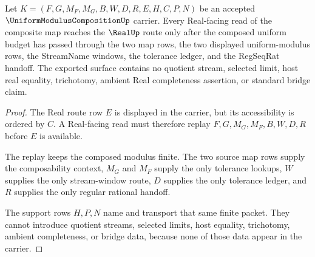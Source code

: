 \begin{theorem}
\label{thm:uniform-modulus-composition-real-route}
Let $K=(F,G,M_F,M_G,B,W,D,R,E,H,C,P,N)$ be an accepted $\UniformModulusCompositionUp$ carrier. Every Real-facing read of the composite map reaches the $\RealUp$ route only after the composed uniform budget has passed through the two map rows, the two displayed uniform-modulus rows, the StreamName windows, the tolerance ledger, and the RegSeqRat handoff. The exported surface contains no quotient stream, selected limit, host real equality, trichotomy, ambient Real completeness assertion, or standard bridge claim.
\end{theorem}
\begin{proof}
The Real route row $E$ is displayed in the carrier, but its accessibility is ordered by $C$. A Real-facing read must therefore replay $F,G,M_G,M_F,B,W,D,R$ before $E$ is available.

The replay keeps the composed modulus finite. The two source map rows supply the composability context, $M_G$ and $M_F$ supply the only tolerance lookups, $W$ supplies the only stream-window route, $D$ supplies the only tolerance ledger, and $R$ supplies the only regular rational handoff.

The support rows $H,P,N$ name and transport that same finite packet. They cannot introduce quotient streams, selected limits, host equality, trichotomy, ambient completeness, or bridge data, because none of those data appear in the carrier.
\end{proof}

\begin{closurestatus}{\UniformModulusCompositionUp}
  \theoryclosure{\seedClosure}
  \formalstatus{\unformalizedV}
\end{closurestatus}

